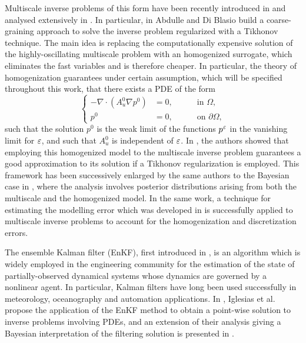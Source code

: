\documentclass[10pt]{article}
\begin{document}
Multiscale inverse problems of this form have been recently introduced in \cite{NPS12} and analysed extensively in \cite{AbD17, AbD18}. In particular, in \cite{AbD17} Abdulle and Di Blasio build a coarse-graining approach to solve the inverse problem regularized with a Tikhonov technique. The main idea is replacing the computationally expensive solution of the highly-oscillating multiscale problem with an homogenized surrogate, which eliminates the fast variables and is therefore cheaper. In particular, the theory of homogenization guarantees under certain assumption, which will be specified throughout this work, that there exists a PDE of the form
\begin{equation}
\left\{
\begin{alignedat}{2}
- \nabla \cdot ( A^0_u \nabla p^0 ) &= 0, \quad && \text{ in } \Omega, \\
p^0 &= 0, \quad && \text{ on } \partial \Omega,
\end{alignedat}
\right.
\end{equation}
such that the solution $p^0$ is the weak limit of the functions $p^\varepsilon$ in the vanishing limit for $\varepsilon$, and such that $A_u^0$ is independent of $\varepsilon$. In \cite{AbD17}, the authors showed that employing this homogenized model to the multiscale inverse problem guarantees a good approximation to its solution if a Tikhonov regularization is employed. This framework has been successively enlarged by the same authors to the Bayesian case in \cite{AbD17}, where the analysis involves posterior distributions arising from both the multiscale and the homogenized model. In the same work, a technique for estimating the modelling error which was developed in \cite{CES14, CDS18} is successfully applied to multiscale inverse problems to account for the homogenization and discretization errors.

The ensemble Kalman filter (EnKF), first introduced in \cite{Eve94}, is an algorithm which is widely employed in the engineering community for the estimation of the state of partially-observed dynamical systems whose dynamics are governed by a nonlinear agent. In particular, Kalman filters have long been used successfully in meteorology, oceanography and automation applications. In \cite{ILS13}, Iglesias et al. propose the application of the EnKF method to obtain a point-wise solution to inverse problems involving PDEs, and an extension of their analysis giving a Bayesian interpretation of the filtering solution is presented in \cite{ScS17}.
\end{document}
